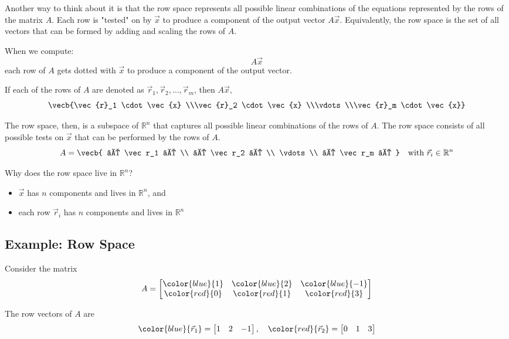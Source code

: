Another way to think about it is that the row space represents all possible linear combinations of the equations represented by the rows of the matrix $A$. Each row is "tested" on by $\vec{x}$ to produce a component of the output vector $A\vec{x}$. Equivalently, the row space is the set of all vectors that can be formed by adding and scaling the rows of $A$.

When we compute:
\[A \vec{x}\]
each row of $A$ gets dotted with $\vec{x}$ to produce a component of the output vector. 

If each of the rows of $A$ are denoted as $\vec{r}_1, \vec{r}_2, \ldots, \vec{r}_m$, then $A\vec{x}$,
$$\vecb{\vec{r}_1 \cdot \vec{x} \\\vec{r}_2 \cdot \vec{x} \\\vdots \\\vec{r}_m \cdot \vec{x}}$$

The row space, then, is a subspace of $\mathbb{R}^n$ that captures all possible linear combinations of the rows of $A$. The row space consists of all possible tests on $\vec{x}$ that can be performed by the rows of $A$.
$$A=\vecb{
— \vec r_1 — \\
— \vec r_2 — \\
\vdots \\
— \vec r_m —
}
\quad \text{with } \vec r_i \in \mathbb{R}^n$$

Why does the row space live in $\mathbb{R}^n$? 
\begin{itemize}
    \item $\vec{x}$ has $n$ components and lives in $\mathbb{R}^n$, and
    \item each row $\vec{r}_i$ has $n$ components and lives in $\mathbb{R}^n$
\end{itemize}

\subsection{Example: Row Space}
Consider the matrix
\[
A =
\begin{bmatrix}
\color{blue}{1} & \color{blue}{2} & \color{blue}{-1} \\
\color{red}{0} & \color{red}{1} & \color{red}{3}
\end{bmatrix}
\]

The row vectors of $A$ are
\[
\color{blue}{\vec r_1} =
\begin{bmatrix}1 & 2 & -1\end{bmatrix},
\quad
\color{red}{\vec r_2} =
\begin{bmatrix}0 & 1 & 3\end{bmatrix}
\]

